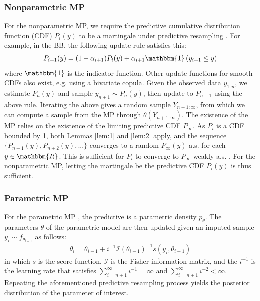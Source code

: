 \documentclass[11pt,a4paper]{article}
\theoremstyle{plain}
\theoremstyle{remark}
\theoremstyle{remark}
\begin{document}
\subsubsection{Nonparametric MP}
For the nonparametric MP, we require the predictive cumulative distribution function (CDF) $P_i(y)$ to be a martingale under predictive resampling \cite{fortini2020quasi,fong2023martingale}. For example, in the BB, the following update rule satisfies this:
\begin{align*}
    P_{i+1}(y) = (1-\alpha_{i+1})P_i(y) + \alpha_{i+1} \mathbbm{1}\left(y_{i+1} \leq y\right)
\end{align*}
where $\mathbbm{1}$ is the indicator function. Other update functions for smooth CDFs also exist, e.g. using a bivariate copula. Given the observed data $y_{1:n}$, we estimate $P_n(y)$ and sample $y_{n+1} \sim P_n(y)$, then update to $P_{n+1}$ using the above rule. Iterating the above gives a random sample $Y_{n+1:\infty}$, from which we can compute a sample from the MP through $\theta(Y_{n+1:\infty})$. 
The existence of the MP relies on the existence of the limiting predictive CDF $P_\infty$. As $P_i$ is a CDF bounded by 1, both Lemmas \ref{lem:1} and \ref{lem:2} apply, and the sequence $\{P_{n+1}(y), P_{n+2}(y),...\}$ converges to a random $P_\infty(y)$ a.s. for each $y \in \mathbbm{R}$. This is sufficient for $P_i$ to converge to $P_\infty$ weakly a.s. \citep{berti2004limit}. For the nonparametric MP, letting the martingale be the predictive CDF $P_i(y)$ is thus sufficient.

\subsubsection{Parametric MP}

For the parametric MP \citep{holmes2023statistical, fong2024asymptotics, fortini2025exchangeability}, 
the predictive is a parametric density $p_{\theta}$. The parameters $\theta$ of the parametric model are then updated given an imputed sample $y_i\sim f_{\theta_{i-1}}$ as follows: 
\begin{align}\label{eq:param_MP}
    \theta_{i} =\theta_{i-1} + i^{-1}\mathcal{I}(\theta_{i-1})^{-1} s(y_{i}, \theta_{i-1})
\end{align}
in which $s$ is the score function, $\mathcal{I}$ is the Fisher information matrix, and the $i^{-1}$ is the learning rate that satisfies $\sum_{i=n+1}^\infty i^{-1}=\infty$ and $\sum_{i=n+1}^\infty i^{-2}<\infty$. Repeating the aforementioned predictive resampling process yields the posterior distribution of the parameter of interest. 
\end{document}
